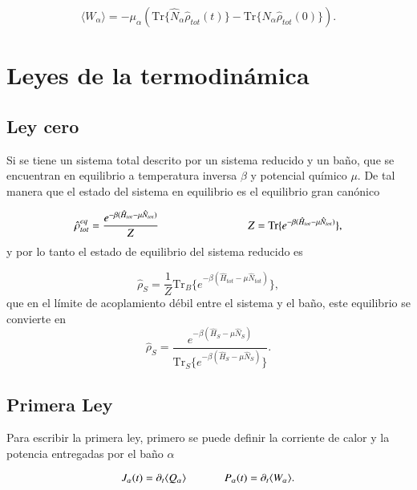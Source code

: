 \begin{equation}
    \langle W_{\alpha}\rangle = - \mu_{\alpha} (\text{Tr}\{\hat{N}_{\alpha} \hat{\rho}_{tot}(t) \} - \text{Tr}\{\hat{N}_{\alpha}\hat{\rho}_{tot}(0) \}  ).
    \label{sec3:trabajo}
\end{equation}
\label{sec3workheat}

\newpage

\section{Leyes de la termodinámica}
\label{Leyestermo}
\subsection{Ley cero}
Si se tiene un sistema total descrito por un sistema reducido y un baño, que se encuentran en equilibrio a temperatura inversa $\beta$ y potencial químico $\mu$. De tal manera que el estado del sistema en equilibrio es el equilibrio gran canónico

\begin{equation*}
    \hat{\rho}^{eq}_{tot} = \frac{e^{-\beta(\hat{H}_{tot} - \mu \hat{N}_{tot})}}{Z}  \hspace{28mm} Z = \text{Tr}\{e^{-\beta(\hat{H}_{tot} - \mu \hat{N}_{tot})} \},
\end{equation*}
y por lo tanto el estado de equilibrio del sistema reducido es

\begin{equation*}
    \hat{\rho}_{S} = \frac{1}{Z}\text{Tr}_{B}\{ e^{-\beta(\hat{H}_{tot} - \mu \hat{N}_{tot})} \},
\end{equation*}
que en el límite de acoplamiento débil entre el sistema y el baño, este equilibrio se convierte en \cite{geva2000second}
\begin{equation*}
    \hat{\rho}_{S} = \frac{e^{-\beta(\hat{H}_{S} - \mu\hat{N}_{S})}}{\text{Tr}_{S}\{e^{-\beta(\hat{H}_{S} - \mu \hat{N}_{S})} \} }.
\end{equation*}

\subsection{Primera Ley}
Para escribir la primera ley, primero se puede definir la corriente de calor y la potencia entregadas por el baño $\alpha$

\begin{equation*}
    J_{\alpha}(t) = \partial_{t}\langle Q_{\alpha}\rangle \hspace{12mm}  P_{\alpha}(t) = \partial_{t}\langle W_{\alpha}\rangle.
\end{equation*}

